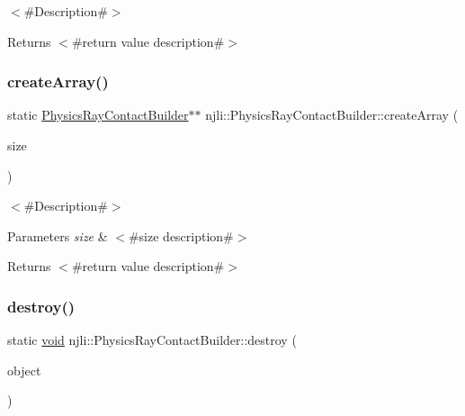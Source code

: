 $<$\#\+Description\#$>$

\begin{DoxyReturn}{Returns}
$<$\#return value description\#$>$ 
\end{DoxyReturn}
\mbox{\label{classnjli_1_1_physics_ray_contact_builder_a9ba1430a1963afc623987d50200c616d}} 
\subsubsection{\texorpdfstring{create\+Array()}{createArray()}}
{\footnotesize\ttfamily static \mbox{\hyperlink{classnjli_1_1_physics_ray_contact_builder}{Physics\+Ray\+Contact\+Builder}}$\ast$$\ast$ njli\+::\+Physics\+Ray\+Contact\+Builder\+::create\+Array (\begin{DoxyParamCaption}\item[{const \mbox{\hyperlink{_util_8h_a10e94b422ef0c20dcdec20d31a1f5049}{u32}}}]{size }\end{DoxyParamCaption})\hspace{0.3cm}{\ttfamily [static]}}

$<$\#\+Description\#$>$


\begin{DoxyParams}{Parameters}
{\em size} & $<$\#size description\#$>$\\
\hline
\end{DoxyParams}
\begin{DoxyReturn}{Returns}
$<$\#return value description\#$>$ 
\end{DoxyReturn}
\mbox{\label{classnjli_1_1_physics_ray_contact_builder_ac398ac93035c6ad5eda3abf5fc242813}} 
\subsubsection{\texorpdfstring{destroy()}{destroy()}}
{\footnotesize\ttfamily static \mbox{\hyperlink{_thread_8h_af1e856da2e658414cb2456cb6f7ebc66}{void}} njli\+::\+Physics\+Ray\+Contact\+Builder\+::destroy (\begin{DoxyParamCaption}\item[{\mbox{\hyperlink{classnjli_1_1_physics_ray_contact_builder}{Physics\+Ray\+Contact\+Builder}} $\ast$}]{object }\end{DoxyParamCaption})\hspace{0.3cm}{\ttfamily [static]}}

